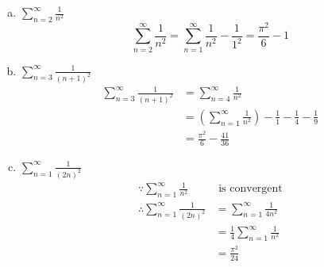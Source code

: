 \documentclass{article}
\begin{document}
    \begin{enumerate}[(a)]
        \item $\sum_{n=2}^\infty \frac{1}{n^2}$
        $$\sum_{n=2}^\infty \frac{1}{n^2} = \sum_{n=1}^\infty \frac{1}{n^2} - \frac{1}{1^2} = \frac{\pi^2}{6} - 1$$

        \item $\sum_{n=3}^\infty \frac{1}{(n+1)^2}$
        $$\begin{aligned}
            \sum_{n=3}^\infty \frac{1}{(n+1)^2} &= \sum_{n=4}^\infty \frac{1}{n^2} \\
            &= (\sum_{n=1}^\infty \frac{1}{n^2}) - \frac{1}{1} - \frac{1}{4} - \frac{1}{9} \\
            &= \frac{\pi^2}{6} - \frac{41}{36}
        \end{aligned}$$

        \item $\sum_{n=1}^\infty \frac{1}{(2n)^2}$
        $$\begin{aligned}
            \because \sum_{n=1}^\infty \frac{1}{n^2} &\textrm{ is convergent} \\
            \therefore \sum_{n=1}^\infty \frac{1}{(2n)^2} &= \sum_{n=1}^\infty \frac{1}{4n^2} \\
            &= \frac 1 4 \sum_{n=1}^\infty \frac{1}{n^2} \\
            &= \frac{\pi^2}{24}
        \end{aligned}$$
    \end{enumerate}
\end{document}
